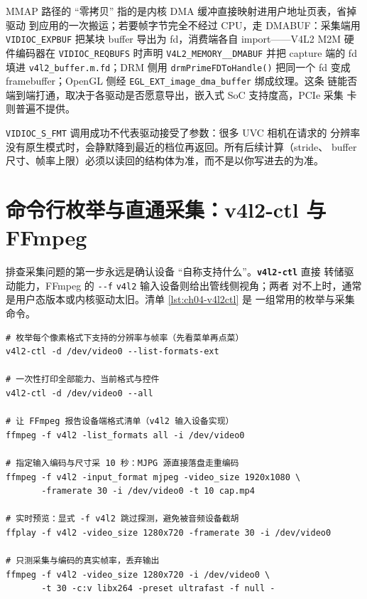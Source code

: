 \documentclass[12pt,a4paper,fontset=fandol]{ctexbook}
\newcommand{\Fn}[1]{\texttt{#1()}}
\newcommand{\Tp}[1]{\texttt{#1}}
\newcommand{\Opt}[1]{\texttt{-\/-#1}}
\newcommand{\Bk}{\discretionary{}{}{}}
\newcommand{\Lib}[1]{\textbf{\texttt{#1}}}
\begin{document}
MMAP 路径的 ``零拷贝'' 指的是内核 DMA 缓冲直接映射进用户地址页表，省掉驱动
到应用的一次搬运；若要帧字节完全不经过 CPU，走 DMABUF：采集端用
\Tp{VIDIOC\_EXPBUF} 把某块 buffer 导出为 fd，消费端各自 import——V4L2 M2M
硬件编码器在 \Tp{VIDIOC\_REQBUFS} 时声明
\Tp{V4L2\_MEMORY\Bk\_\_DMABUF} 并把 capture 端的 fd 填进
\Tp{v4l2\_buffer.m.fd}；DRM 侧用 \Fn{drmPrimeFDToHandle} 把同一个 fd 变成
framebuffer；OpenGL 侧经 \Tp{EGL\_EXT\_image\_dma\_buffer} 绑成纹理。这条
链能否端到端打通，取决于各驱动是否愿意导出，嵌入式 SoC 支持度高，PCIe 采集
卡则普遍不提供。

\begin{warning}[title={S\_FMT 谈成的格式未必是你请求的格式}]
\Tp{VIDIOC\_S\_FMT} 调用成功不代表驱动接受了参数：很多 UVC 相机在请求的
分辨率没有原生模式时，会静默降到最近的档位再返回。所有后续计算（stride、
buffer 尺寸、帧率上限）必须以读回的结构体为准，而不是以你写进去的为准。
\end{warning}

\section{命令行枚举与直通采集：v4l2-ctl 与 FFmpeg}

排查采集问题的第一步永远是确认设备 ``自称支持什么''。\Lib{v4l2-ctl} 直接
转储驱动能力，FFmpeg 的 \Opt{f} \Tp{v4l2} 输入设备则给出管线侧视角；两者
对不上时，通常是用户态版本或内核驱动太旧。清单 \ref{lst:ch04-v4l2ctl} 是
一组常用的枚举与采集命令。

\begin{lstlisting}[style=shellstyle,caption={用 v4l2-ctl 枚举能力，用 ffmpeg/ffplay 直通采集},label={lst:ch04-v4l2ctl}]
# 枚举每个像素格式下支持的分辨率与帧率（先看菜单再点菜）
v4l2-ctl -d /dev/video0 --list-formats-ext

# 一次性打印全部能力、当前格式与控件
v4l2-ctl -d /dev/video0 --all

# 让 FFmpeg 报告设备端格式清单（v4l2 输入设备实现）
ffmpeg -f v4l2 -list_formats all -i /dev/video0

# 指定输入编码与尺寸采 10 秒：MJPG 源直接落盘走重编码
ffmpeg -f v4l2 -input_format mjpeg -video_size 1920x1080 \
       -framerate 30 -i /dev/video0 -t 10 cap.mp4

# 实时预览：显式 -f v4l2 跳过探测，避免被音频设备截胡
ffplay -f v4l2 -video_size 1280x720 -framerate 30 -i /dev/video0

# 只测采集与编码的真实帧率，丢弃输出
ffmpeg -f v4l2 -video_size 1280x720 -i /dev/video0 \
       -t 30 -c:v libx264 -preset ultrafast -f null -
\end{lstlisting}
\end{document}

